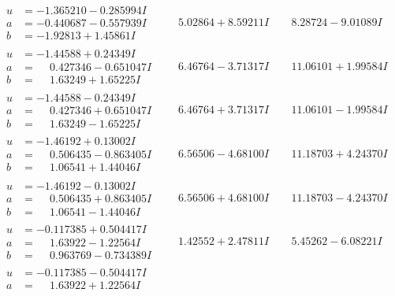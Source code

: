 \documentclass[1p]{elsarticle_modified}
\theoremstyle{definition}
\begin{document}
$$\begin{array}{c|c|c}
\begin{aligned}
u &= -1.365210 - 0.285994 I \\
a &= -0.440687 - 0.557939 I \\
b &= -1.92813 + 1.45861 I\end{aligned}
 & \phantom{-}5.02864 + 8.59211 I & \phantom{-}8.28724 - 9.01089 I \\ \hline\begin{aligned}
u &= -1.44588 + 0.24349 I \\
a &= \phantom{-}0.427346 - 0.651047 I \\
b &= \phantom{-}1.63249 + 1.65225 I\end{aligned}
 & \phantom{-}6.46764 - 3.71317 I & \phantom{-}11.06101 + 1.99584 I \\ \hline\begin{aligned}
u &= -1.44588 - 0.24349 I \\
a &= \phantom{-}0.427346 + 0.651047 I \\
b &= \phantom{-}1.63249 - 1.65225 I\end{aligned}
 & \phantom{-}6.46764 + 3.71317 I & \phantom{-}11.06101 - 1.99584 I \\ \hline\begin{aligned}
u &= -1.46192 + 0.13002 I \\
a &= \phantom{-}0.506435 - 0.863405 I \\
b &= \phantom{-}1.06541 + 1.44046 I\end{aligned}
 & \phantom{-}6.56506 - 4.68100 I & \phantom{-}11.18703 + 4.24370 I \\ \hline\begin{aligned}
u &= -1.46192 - 0.13002 I \\
a &= \phantom{-}0.506435 + 0.863405 I \\
b &= \phantom{-}1.06541 - 1.44046 I\end{aligned}
 & \phantom{-}6.56506 + 4.68100 I & \phantom{-}11.18703 - 4.24370 I \\ \hline\begin{aligned}
u &= -0.117385 + 0.504417 I \\
a &= \phantom{-}1.63922 - 1.22564 I \\
b &= \phantom{-}0.963769 - 0.734389 I\end{aligned}
 & \phantom{-}1.42552 + 2.47811 I & \phantom{-}5.45262 - 6.08221 I \\ \hline\begin{aligned}
u &= -0.117385 - 0.504417 I \\
a &= \phantom{-}1.63922 + 1.22564 I \\

\end{aligned}
\end{array}$$
\end{document}
